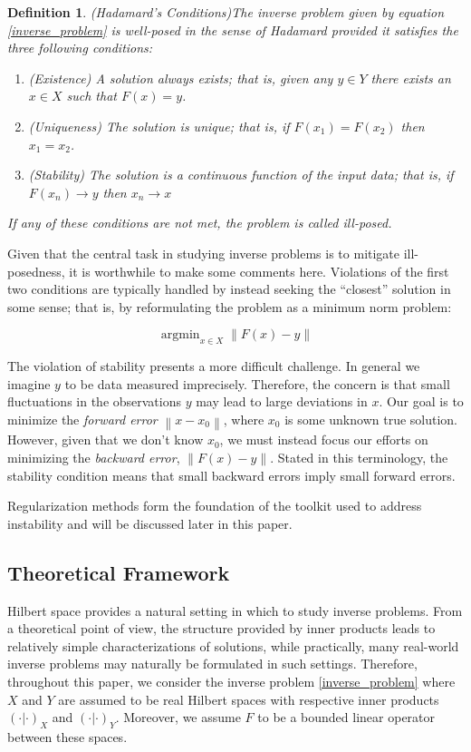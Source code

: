 \documentclass[12pt]{article}
\newcommand*{\norm}[1]{\left\lVert#1\right\rVert}
\DeclareMathOperator*{\argmin}{argmin}
\newtheorem*{definition}{Definition}
\begin{document}
\begin{definition} 
(Hadamard's Conditions)The inverse problem given by equation \eqref{inverse_problem} is well-posed in the sense of Hadamard 
provided it satisfies the three following conditions:
\begin{enumerate} 
\item (Existence) A solution always exists; that is, given any $y \in Y$ there exists an $x \in X$ such that $F(x) = y$. 
\item (Uniqueness) The solution is unique; that is, if $F(x_1) = F(x_2)$ then $x_1 = x_2$.
\item (Stability) The solution is a continuous function of the input data; that is, if $F(x_n) \to y$  then $x_n \to x$
\end{enumerate} 
If any of these conditions are not met, the problem is called ill-posed. 
\end{definition} 

Given that the central task in studying inverse problems is to mitigate ill-posedness, it is worthwhile to make some comments here. 
Violations of the first two conditions are typically handled by 
instead seeking the ``closest'' solution in some sense; that is, by reformulating the problem as a minimum norm problem: 

\begin{equation}
\argmin_{x \in X} \norm{F(x) - y} \label{min_norm}
\end{equation}

 The violation of stability presents a more difficult challenge. In general we imagine $y$ to be data measured imprecisely. 
 Therefore, the concern is that small fluctuations in the observations $y$ may lead to large deviations in $x$. 
Our goal is to minimize the \textit{forward error} $\norm{x - x_0}$, where $x_0$ is some unknown true solution. However, 
given that we don't know $x_0$, we must instead focus our efforts on minimizing the \textit{backward error}, $\norm{F(x) - y}$. 
Stated in this terminology, the stability condition means that small backward errors imply small forward errors. 

 Regularization methods form the foundation of the toolkit used to address instability and will be discussed later in this paper. 

\subsection{Theoretical Framework}

Hilbert space provides a natural setting in which to study inverse problems. From a theoretical point of view, the structure provided by 
inner products leads to relatively simple characterizations of solutions, while practically, many real-world inverse problems may 
naturally be formulated in such settings. Therefore, throughout this paper, we consider the inverse problem \eqref{inverse_problem}
where $X$ and $Y$ are assumed to be real Hilbert spaces with respective inner products $(\cdot | \cdot)_X$ and $(\cdot | \cdot)_Y$. 
Moreover, we assume $F$ to be a bounded linear operator between these spaces. 
\end{document}
